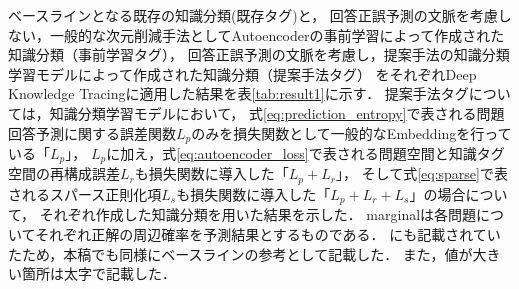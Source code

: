 \begin{table}[!htb]
\caption{各知識分類の知識獲得予測における予測性能}
\label{tab:result1}
\begin{center}
\end{center}
\end{table}


ベースラインとなる既存の知識分類(既存タグ)と，
回答正誤予測の文脈を考慮しない，一般的な次元削減手法としてAutoencoderの事前学習によって作成された知識分類（事前学習タグ），
回答正誤予測の文脈を考慮し，提案手法の知識分類学習モデルによって作成された知識分類（提案手法タグ）
をそれぞれDeep Knowledge Tracingに適用した結果を表\ref{tab:result1}に示す．
提案手法タグについては，知識分類学習モデルにおいて，
式\ref{eq:prediction_entropy}で表される問題回答予測に関する誤差関数$L_p$のみを損失関数として一般的なEmbeddingを行っている「$L_p$」，
$L_pに加え，$式\ref{eq:autoencoder_loss}で表される問題空間と知識タグ空間の再構成誤差$L_r$も損失関数に導入した「$L_p + L_r$」，
そして式\ref{eq:sparse}で表されるスパース正則化項$L_s$も損失関数に導入した「$L_p + L_r + L_s$」の場合について，
それぞれ作成した知識分類を用いた結果を示した．
marginalは各問題についてそれぞれ正解の周辺確率を予測結果とするものである．
\cite{piech2015deep}にも記載されていたため，本稿でも同様にベースラインの参考として記載した．
また，値が大きい箇所は太字で記載した．

